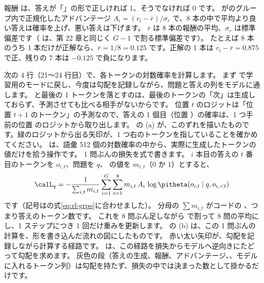 報酬  は、答えが「」の形で正しければ 1、そうでなければ 0 です。
 がのグループ内で正規化したアドバンテージ $A_i = (r_i - \bar r)/\sigma_r$ で、8 本の中で平均より良い答えは確率を上げ、悪い答えは下げます。
$\bar r$ は 8 本の報酬の平均、$\sigma_r$ は標準偏差です（ は、第 22 章と同じく $G-1$ で割る標準偏差です）。
たとえば 8 本のうち 1 本だけが正解なら、$\bar r = 1/8 = 0.125$ です。正解の 1 本は $r_i-\bar r=0.875$ で正、残りの 7 本は $-0.125$ で負になります。

次の 4 行（21〜24 行目）で、各トークンの対数確率を計算します。
まず  で学習用のモードに戻し、今度は勾配を記録しながら、問題と答えの列をモデルに通します。
 と最後の 1 トークンを落とすのは、最後のトークンの「次」は生成しておらず、予測させても比べる相手がないからです。
位置 $t$ のロジットは「位置 $t+1$ のトークン」の予測なので、答えの 1 個目（位置 ）の確率は、1 つ手前の位置  のロジットから取り出します。
の (a) が、このずれを描いたものです。緑のロジットから出る矢印が、1 つ右のトークンを指していることを確かめてください。
 は、語彙 512 個の対数確率の中から、実際に生成したトークンの値だけを拾う操作です。
1 問ぶんの損失を式で書きます。
$i$ 本目の答えの $t$ 番目のトークンを $o_{i,t}$、問題を $q$、 の値を $m_{i,t}$（0 か 1）とすると、
\begin{equation}
\calL_q = -\frac{1}{\sum_{i,t} m_{i,t}}\sum_{i=1}^{G}\sum_{t=1}^{8} m_{i,t}\,A_i\,\log\pitheta(o_{i,t}\mid q,o_{i,<t})
\label{eq:cap-grpo-loss}
\end{equation}
です（記号はの式\eqref{eq:rl-grpo}に合わせました）。
分母の $\sum m_{i,t}$ がコードの 、つまり答えのトークン数です。
これを 8 問ぶん足しながら  で割って 8 問の平均にし、1 ステップにつき 1 回だけ重みを更新します。
の (b) は、この 1 問ぶんの計算を、形を書き込んだ流れの図にしたものです。
赤い太い矢印が、勾配を記録しながら計算する経路です。 は、この経路を損失からモデルへ逆向きにたどって勾配を求めます。
灰色の段（答えの生成、報酬、アドバンテージ、、モデルに入れるトークン列）は勾配を持たず、損失の中では決まった数として掛かるだけです。

